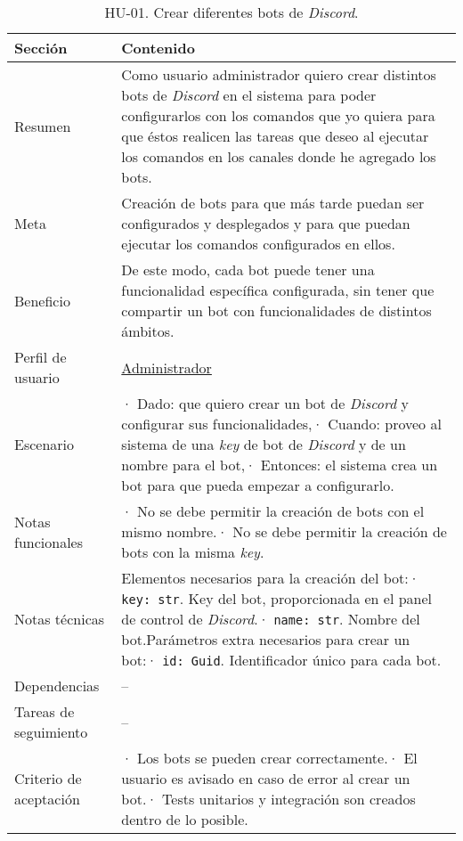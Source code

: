\begin{table}[H]
    \centering
    \def\arraystretch{1.25}
    \begin{adjustbox}{max width=\textwidth}
    \begin{tabularx}{\textwidth}{|l|L|}
    \hline
        \textbf{Sección} & \textbf{Contenido} \\ \hline
    \hline
        Resumen & Como usuario administrador quiero crear distintos bots de \textit{Discord} en el sistema para poder configurarlos con los comandos que yo quiera para que éstos realicen las tareas que deseo al ejecutar los comandos en los canales donde he agregado los bots. \\ \hline
        Meta & Creación de bots para que más tarde puedan ser configurados y desplegados y para que puedan ejecutar los comandos configurados en ellos. \\ \hline
        Beneficio & De este modo, cada bot puede tener una funcionalidad específica configurada, sin tener que compartir un bot con funcionalidades de distintos ámbitos. \\ \hline
        Perfil de usuario & \hyperref[sec:personaAdmin]{Administrador} \\ \hline
        Escenario & · Dado: que quiero crear un bot de \textit{Discord} y configurar sus funcionalidades,\linebreak · Cuando: proveo al sistema de una \textit{key} de bot de \textit{Discord} y de un nombre para el bot,\linebreak · Entonces: el sistema crea un bot para que pueda empezar a configurarlo. \\ \hline
        Notas funcionales & · No se debe permitir la creación de bots con el mismo nombre.\linebreak · No se debe permitir la creación de bots con la misma \textit{key}. \\ \hline
        Notas técnicas & Elementos necesarios para la creación del bot:\linebreak · \verb|key: str|. Key del bot, proporcionada en el panel de control de \textit{Discord}.\linebreak · \verb|name: str|. Nombre del bot.\linebreak \linebreak Parámetros extra necesarios para crear un bot:\linebreak · \verb|id: Guid|. Identificador único para cada bot. \\ \hline
        Dependencias & – \\ \hline
        Tareas de seguimiento & – \\ \hline
        Criterio de aceptación & · Los bots se pueden crear correctamente.\linebreak · El usuario es avisado en caso de error al crear un bot.\linebreak · Tests unitarios y integración son creados dentro de lo posible. \\ \hline
    \end{tabularx}
    \end{adjustbox}
    \caption{HU-01. Crear diferentes bots de \textit{Discord}.}
\end{table}


